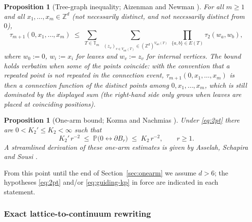 \documentclass[11pt]{article}
\newtheorem{proposition}[theorem]{Proposition}
\theoremstyle{definition}
\theoremstyle{remark}
\newcommand{\Z}{\mathbb{Z}}
\newcommand{\bP}{\mathbb{P}}
\newcommand{\T}{\mathbb{T}}                    %
\numberwithin{equation}{section}
\theoremstyle{plain}
\theoremstyle{definition}
\theoremstyle{remark}
\theoremstyle{plain}
\begin{document}
\begin{proposition}[Tree-graph inequality; Aizenman and Newman
\cite{AN84}]\label{prop:AN}
For all $m\ge1$ and \emph{all} $x_1,\dots,x_m\in\Z^d$ (not necessarily
distinct, and not necessarily distinct from $0$),
\begin{equation}\label{eq:AN}
\tau_{m+1}(0,x_1,\dots,x_m)\;\le\;
\sum_{T\in\T_m}\ \sum_{(z_v)_{v\in V_{\mathrm{int}}(T)}\in(\Z^d)^{V_{\mathrm{int}}(T)}}
\ \prod_{\{a,b\}\in E(T)}\tau_2(w_a,w_b),
\end{equation}
where $w_0:=0$, $w_i:=x_i$ for leaves and $w_v:=z_v$ for internal vertices.
The bound holds verbatim when some of the points coincide: with the
convention that a repeated point is not repeated in the connection event,
$\tau_{m+1}(0,x_1,\dots,x_m)$ is then a connection function of the distinct
points among $0,x_1,\dots,x_m$, which is still dominated by the displayed
sum (the right-hand side only grows when leaves are placed at coinciding
positions).
\end{proposition}

\begin{proposition}[One-arm bound; Kozma and Nachmias \cite{KN11}]
\label{prop:KN}
Under \eqref{eq:2pt} there are $0<K_2'\le K_2<\infty$ such
that
\[
K_2'\,r^{-2}\;\le\;\bP\bigl(0\leftrightarrow\partial B_r\bigr)\;\le\;K_2\,r^{-2},
\qquad r\ge1 .
\]
A streamlined derivation of these one-arm estimates is given by Asselah, Schapira and Sousi \cite{ASS}.
\end{proposition}

From this point until the end of Section~\ref{sec:onearm} we assume $d>6$;
the hypotheses \eqref{eq:2pt} and/or \eqref{eq:guiding-kp} in force are
indicated in each statement.

\subsubsection{Exact lattice-to-continuum rewriting}
\end{document}
